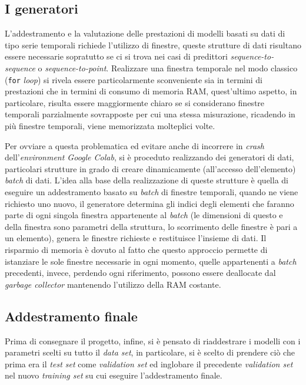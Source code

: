 \documentclass[12pt,a4paper,fleqn]{article}
\begin{document}
\subsection{I generatori}
L'addestramento e la valutazione delle prestazioni di modelli basati su dati di tipo serie temporali richiede l'utilizzo di finestre, queste strutture di dati risultano essere necessarie sopratutto se ci si trova nei casi di predittori \textsl{sequence-to-sequence} o \textsl{sequence-to-point}. Realizzare una finestra temporale nel modo classico (\texttt{for} \textit{loop}) si rivela essere particolarmente sconveniente sia in termini di prestazioni che in termini di consumo di memoria RAM, quest'ultimo aspetto, in particolare, risulta essere maggiormente chiaro se si considerano finestre temporali parzialmente sovrapposte per cui una stessa misurazione, ricadendo in più finestre temporali, viene memorizzata molteplici volte.

Per ovviare a questa problematica ed evitare anche di incorrere in \textsl{crash} dell'\textsl{environment Google Colab}, si è proceduto realizzando dei generatori di dati, particolari strutture in grado di creare dinamicamente (all'accesso dell'elemento) \textsl{batch} di dati. L'idea alla base della realizzazione di queste strutture è quella di eseguire un addestramento basato su \textsl{batch} di finestre temporali, quando ne viene richiesto uno nuovo, il generatore determina gli indici degli elementi che faranno parte di ogni singola finestra appartenente al \textsl{batch} (le dimensioni di questo e della finestra sono parametri della struttura, lo scorrimento delle finestre è pari a un elemento), genera le finestre richieste e restituisce l'insieme di dati. Il risparmio di memoria è dovuto al fatto che questo approccio permette di istanziare le sole finestre necessarie in ogni momento, quelle appartenenti a \textsl{batch} precedenti, invece, perdendo ogni riferimento, possono essere deallocate dal \textsl{garbage collector} mantenendo l'utilizzo della RAM costante.

\subsection{Addestramento finale}
Prima di consegnare il progetto, infine, si è pensato di riaddestrare i modelli con i parametri scelti su tutto il \textsl{data set}, in particolare, si è scelto di prendere ciò che prima era il \textsl{test set} come \textsl{validation set} ed inglobare il precedente \textsl{validation set} nel nuovo \textsl{training set} su cui eseguire l'addestramento finale.
\end{document}
